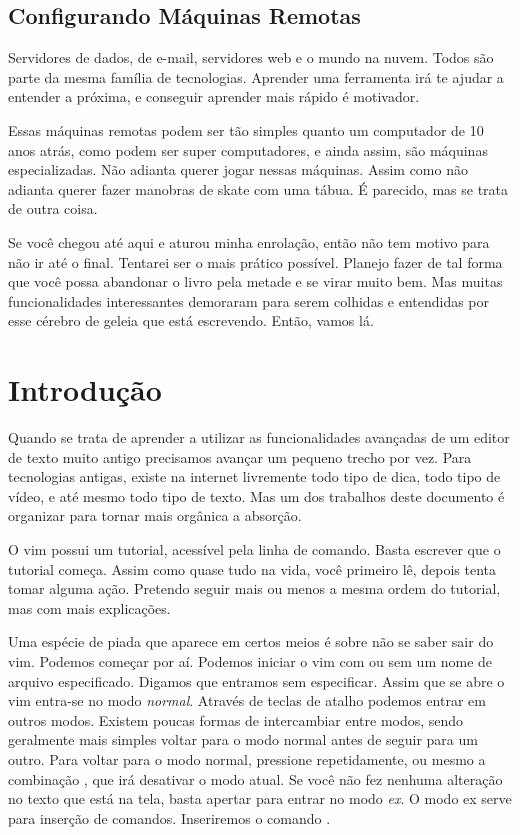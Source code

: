 \documentclass[a4paper, 12pt]{article}
\begin{document}
\subsection{Configurando Máquinas Remotas}
Servidores de dados, de e-mail, servidores web e o mundo na nuvem.
Todos são parte da mesma família de tecnologias.
Aprender uma ferramenta irá te ajudar a entender a próxima, e conseguir aprender mais rápido é motivador.

Essas máquinas remotas podem ser tão simples quanto um computador de 10 anos atrás, como podem ser super computadores, e ainda assim, são máquinas especializadas.
Não adianta querer jogar nessas máquinas.
Assim como não adianta querer fazer manobras de skate com uma tábua.
É parecido, mas se trata de outra coisa.

Se você chegou até aqui e aturou minha enrolação, então não tem motivo para não ir até o final.
Tentarei ser o mais prático possível.
Planejo fazer de tal forma que você possa abandonar o livro pela metade e se virar muito bem.
Mas muitas funcionalidades interessantes demoraram para serem colhidas e entendidas por esse cérebro
de geleia que está escrevendo. Então, vamos lá.

\newpage

\section{Introdução}
Quando se trata de aprender a utilizar as funcionalidades avançadas de um editor de texto muito
antigo precisamos avançar um pequeno trecho por vez.
Para tecnologias antigas, existe na internet livremente todo tipo de dica,
todo tipo de vídeo, e até mesmo todo tipo de texto.
Mas um dos trabalhos deste documento é organizar para tornar mais orgânica a absorção.

O vim possui um tutorial, acessível pela linha de comando.
Basta escrever  que o tutorial começa.
Assim como quase tudo na vida, você primeiro lê, depois tenta tomar alguma ação.
Pretendo seguir mais ou menos a mesma ordem do tutorial, mas com mais explicações.

Uma espécie de piada que aparece em certos meios é sobre não se saber sair do vim.
Podemos começar por aí.
Podemos iniciar o vim com ou sem um nome de arquivo especificado.
Digamos que entramos sem especificar.
Assim que se abre o vim entra-se no modo \emph{normal}.
Através de teclas de atalho podemos entrar em outros modos.
Existem poucas formas de intercambiar entre modos, sendo geralmente mais simples voltar
para o modo normal antes de seguir para um outro.
Para voltar para o modo normal, pressione  repetidamente,
ou mesmo a combinação , que irá desativar o modo atual.
Se você não fez nenhuma alteração no texto que está na tela, basta apertar \vimcommand{:} para entrar no modo \emph{ex}.
O modo ex serve para inserção de comandos.
Inseriremos o comando .
\end{document}
